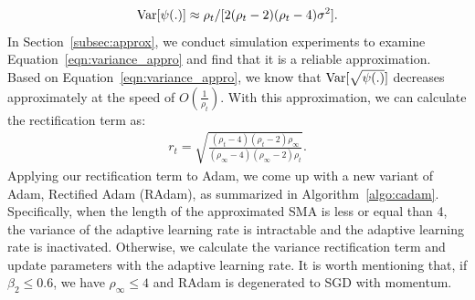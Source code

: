 \begin{align}
\operatorname{{\rm Var}}[\psi(.)] \approx {\rho_t}/[{2(\rho_t - 2) (\rho_t - 4) \sigma^2}].
\label{eqn:variance_appro}
\end{align}
In Section~\ref{subsec:approx}, we conduct simulation experiments to examine Equation~\ref{eqn:variance_appro} and find that it is a reliable approximation. 
Based on Equation~\ref{eqn:variance_appro}, we know that $\operatorname{{\rm Var}}[\sqrt{\psi(.)}]$ decreases approximately at the speed of $O(\frac{1}{\rho_t})$.
With this approximation, we can calculate the rectification term as:
\begin{align*}
r_t = \sqrt{\frac{(\rho_t - 4)(\rho_t - 2)\rho_\infty}{(\rho_\infty - 4)(\rho_\infty - 2)\rho_t}}.
\end{align*}
Applying our rectification term to Adam, we come up with a new variant of Adam, Rectified Adam (RAdam), as summarized in Algorithm~\ref{algo:cadam}. 
Specifically, when the length of the approximated SMA is less or equal than 4, the variance of the adaptive learning rate is intractable and the adaptive learning rate is inactivated. 
Otherwise, we calculate the variance rectification term and update parameters with the adaptive learning rate.
It is worth mentioning that, if $\beta_2 \leq 0.6$, we have $\rho_\infty \leq 4$ and RAdam is degenerated to SGD with momentum. 

